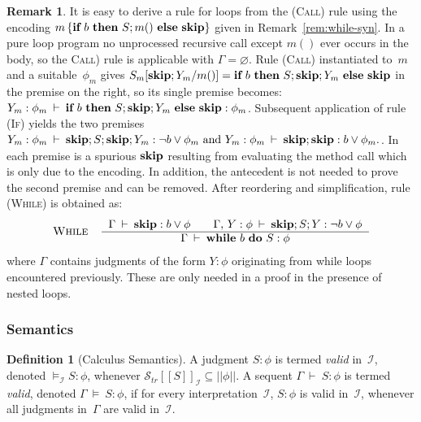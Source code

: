 \documentclass[10pt,a4paper]{amsart}
\theoremstyle{definition}
\newtheorem{definition}[theorem]{Definition}
\newtheorem{remark}[theorem]{Remark}
\newcommand{\denot}[1]{\left[\!\left[#1\right]\!\right]}
\newcommand{\fdenot}[1]{\left|\!\left|#1\right|\!\right|}
\newcommand{\trcdenoti}[1]{\mathcal{S}_{\mathit{tr}}\!\denot{#1}_{\mathcal{I}}}
\newcommand{\Skip}{\mbox{\bf skip}}
\newcommand{\If}{\mbox{\bf if}}
\newcommand{\Then}{\mbox{\bf then}}
\newcommand{\Else}{\mbox{\bf else}}
\newcommand{\While}{\mbox{\bf while}}
\newcommand{\Do}{\mbox{\bf do}}
\newcommand{\judge}[2]{#1 : #2}
\newcommand{\sequent}[2]{#1 \>\vdash\> #2}
\newcommand{\semsequent}[2]{#1 \>\models\> #2}
\newcommand{\Rule}[3]{
   \begin{tabular}{cc}
      {\sc {#1}}
        &
       \begin{tabular}{c}
          ${#2}$ \\ \hline
          ${#3}$ 
       \end{tabular}
    \end{tabular}}
\begin{document}
\begin{remark}\label{rem:while-rule}
  It is easy to derive a rule for loops from the (\textsc{Call}) rule
  using the encoding $m\,\{\If\ b\ \Then\ S;m()\ \Else\ \Skip\}$ given
  in Remark~\ref{rem:while-syn}. In a pure loop program no unprocessed
  recursive call except $m()$ ever occurs in the body, so the
  \textsc{Call}) rule is applicable with $\Gamma=\varnothing$.  Rule
  (\textsc{Call}) instantiated to~$m$ and a suitable~$\phi_m$ gives
  $ S_m[\Skip;Y_m/m()]=\If\ b\ \Then\ S;\Skip;Y_m\ \Else\ \Skip $ in
  the premise on the right, so its single premise becomes:
  $ \sequent{\judge{Y_m}{\phi_m}}{\judge{\If\ b\ \Then\ S;\Skip;Y_m\
      \Else\ \Skip}}{\phi_m} $.  Subsequent application of rule
  (\textsc{If}) yields the two premises
  $ \sequent{\judge{Y_m}{\phi_m}}{\judge{\Skip;S;\Skip;Y_m}}{\lnot
    b\lor\phi_m} \text{ and }
  \sequent{\judge{Y_m}{\phi_m}}{\judge{\Skip;\Skip}}{b\lor\phi_m}.  $.
  In each premise is a spurious $\Skip$ resulting from evaluating the
  method call which is only due to the encoding. In addition, the
  antecedent is not needed to prove the second premise and can be
  removed. After reordering and simplification, rule (\textsc{While})
  is obtained as:
  \[
    \Rule{While}
    {\sequent{\Gamma}{\judge{\Skip}{b \lor \phi}}\qquad
      \sequent{\Gamma,\, \judge{Y}{\phi}}
      {\judge{\Skip; S; Y}{\lnot b \lor \phi}}}
    {\sequent{\Gamma}{\judge{\While\ b\ \Do\ S}{\phi}}}
  \]
  where $\Gamma$ contains judgments of the form $\judge{Y}{\phi}$
  originating from while loops encountered previously. These are only
  needed in a proof in the presence of nested loops.
\end{remark}


\subsubsection{Semantics}

\begin{definition}[Calculus Semantics]
  \label{def:calculus-semantics}
  A judgment $\judge{S}{\phi}$ is termed \emph{valid}
  in~$\mathcal{I}$, denoted $\models_\mathcal{I} \judge{S}{\phi}$,
  whenever $\trcdenoti{S} \subseteq \fdenot{\phi}$.
  A sequent $\sequent{\Gamma}{\judge{S}{\phi}}$ is termed
  \emph{valid}, denoted $\semsequent{\Gamma}{\judge{S}{\phi}}$, if for
  every inter\-pretation~$\mathcal{I}$, $\judge{S}{\phi}$ is valid
  in~$\mathcal{I}$, whenever all judgments in~$\Gamma$ are valid
  in~$\mathcal{I}$.
\end{definition}
\end{document}
